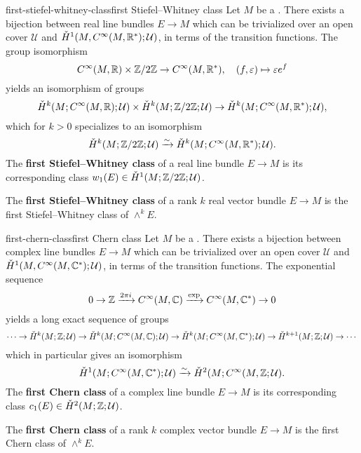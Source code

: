 \begin{topic}{first-stiefel-whitney-class}{first Stiefel--Whitney class}
    Let $M$ be a . There exists a bijection between real line bundles $E \to M$ which can be trivialized over an open cover $\mathcal{U}$ and $\check{H}^1(M, C^\infty(M, \mathbb{R}^*); \mathcal{U})$, in terms of the transition functions. The group isomorphism
    \[ C^\infty(M, \mathbb{R}) \times \mathbb{Z}/2\mathbb{Z} \to C^\infty(M, \mathbb{R}^*), \quad (f, \varepsilon) \mapsto \varepsilon e^f \]
    yields an isomorphism of  groups
    \[ \check{H}^k(M; C^\infty(M, \mathbb{R}); \mathcal{U}) \times \check{H}^k(M; \mathbb{Z}/2\mathbb{Z}; \mathcal{U}) \to \check{H}^k(M; C^\infty(M, \mathbb{R}^*); \mathcal{U}) , \]
    which for $k > 0$ specializes to an isomorphism
    \[ \check{H}^k(M; \mathbb{Z}/2\mathbb{Z}; \mathcal{U}) \xrightarrow{\sim} \check{H}^k(M; C^\infty(M, \mathbb{R}^*); \mathcal{U}) . \]
    The \textbf{first Stiefel--Whitney class} of a real line bundle $E \to M$ is its corresponding class $w_1(E) \in \check{H}^1(M; \mathbb{Z}/2\mathbb{Z}; \mathcal{U})$.
    
    The \textbf{first Stiefel--Whitney class} of a rank $k$ real vector bundle $E \to M$ is the first Stiefel--Whitney class of $\wedge^k E$.
\end{topic}

\begin{topic}{first-chern-class}{first Chern class}
    Let $M$ be a . There exists a bijection between complex line bundles $E \to M$ which can be trivialized over an open cover $\mathcal{U}$ and $\check{H}^1(M, C^\infty(M, \mathbb{C}^*); \mathcal{U})$, in terms of the transition functions. The exponential sequence
    \[ 0 \to \mathbb{Z} \xrightarrow{2 \pi i} C^\infty(M, \mathbb{C}) \xrightarrow{\exp} C^\infty(M, \mathbb{C}^*) \to 0 \]
    yields a long exact sequence of  groups
    \[ \cdots \to \check{H}^k(M; \mathbb{Z}; \mathcal{U}) \to \check{H}^k(M; C^\infty(M, \mathbb{C}); \mathcal{U}) \to \check{H}^k(M; C^\infty(M, \mathbb{C}^*); \mathcal{U}) \to \check{H}^{k + 1}(M; \mathbb{Z}; \mathcal{U}) \to \cdots \]
    which in particular gives an isomorphism
    \[ \check{H}^1(M; C^\infty(M, \mathbb{C}^*); \mathcal{U}) \xrightarrow{\sim} \check{H}^2(M; C^\infty(M, \mathbb{Z}; \mathcal{U}) . \]
    The \textbf{first Chern class} of a complex line bundle $E \to M$ is its corresponding class $c_1(E) \in \check{H}^2(M; \mathbb{Z}; \mathcal{U})$.
    
    The \textbf{first Chern class} of a rank $k$ complex vector bundle $E \to M$ is the first Chern class of $\wedge^k E$.
\end{topic}

